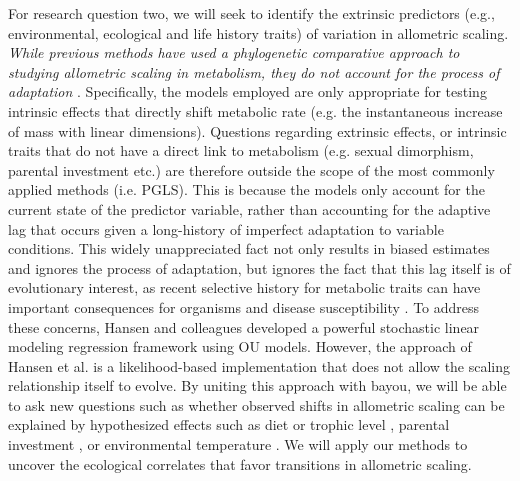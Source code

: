 \documentclass[10pt, a4paper]{article}
\begin{document}
For research question two, we will seek to identify the extrinsic predictors (e.g.,  environmental, ecological and life history traits) of variation in allometric scaling.  \textit{While previous methods have used a phylogenetic comparative approach to studying allometric scaling in metabolism, they do not account for the process of adaptation} \cite{HansenOrzack2005, HansenBartoszek2012}. Specifically, the models employed are only appropriate for testing intrinsic effects that directly shift metabolic rate (e.g. the instantaneous increase of mass with linear dimensions). Questions regarding extrinsic effects, or intrinsic traits that do not have a direct link to metabolism (e.g. sexual dimorphism, parental investment etc.) are therefore outside the scope of the most commonly applied methods (i.e. PGLS). This is because the models only account for the current state of the predictor variable, rather than accounting for the adaptive lag that occurs given a long-history of imperfect adaptation to variable conditions. This widely unappreciated fact not only results in biased estimates and ignores the process of adaptation, but ignores the fact that this lag itself is of evolutionary interest, as recent selective history for metabolic traits can have important consequences for organisms and disease susceptibility \cite{Wisloff2005}. To address these concerns, Hansen and colleagues \cite{Hansen2008} developed a powerful stochastic linear modeling regression framework using OU models. However, the approach of Hansen et al. \cite{Hansen2008} is a likelihood-based implementation that does not allow the scaling relationship itself to evolve. By uniting this approach with bayou, we will be able to ask new questions such as whether observed shifts in allometric scaling can be explained by hypothesized effects such as diet or trophic level \cite{McNab2000}, parental investment \cite{Koteja2000}, or environmental temperature \cite{Gillooly2001}. We will apply our methods to uncover the ecological correlates that favor transitions in allometric scaling.\
\end{document}
